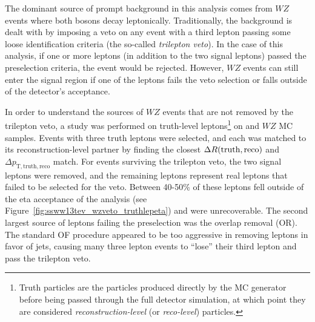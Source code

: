 The dominant source of prompt background in this analysis comes from $WZ$ events where both bosons decay leptonically.
Traditionally, the background is dealt with by imposing a veto on any event with a third lepton passing some loose identification criteria (the so-called \emph{trilepton veto}).
In the case of this analysis, if one or more leptons (in addition to the two signal leptons) passed the preselection criteria, the event would be rejected.
However, $WZ$ events can still enter the signal region if one of the leptons fails the veto selection or falls outside of the detector's acceptance.

In order to understand the sources of $WZ$ events that are not removed by the trilepton veto, a study was performed on truth-level leptons\footnote{Truth particles are the particles produced directly by the MC generator before being passed through the full detector simulation, at which point they are considered \emph{reconstruction-level} (or \emph{reco-level}) particles.} on \ssww and $WZ$ MC samples.
Events with three truth leptons were selected, and each was matched to its reconstruction-level partner by finding the closest $\Delta R(\textrm{truth},\textrm{reco})$ and $\Delta p_{\textrm{T},\textrm{truth},\textrm{reco}}$ match.
For events surviving the trilepton veto, the two signal leptons were removed, and the remaining leptons represent real leptons that failed to be selected for the veto.
Between 40-50\% of these leptons fell outside of the eta acceptance of the analysis (see Figure~\ref{fig:ssww13tev_wzveto_truthlepeta}) and were unrecoverable.
The second largest source of leptons failing the preselection was the overlap removal (OR). 
The standard OF procedure appeared to be too aggressive in removing leptons in favor of jets, causing many three lepton events to ``lose'' their third lepton and pass the trilepton veto.

